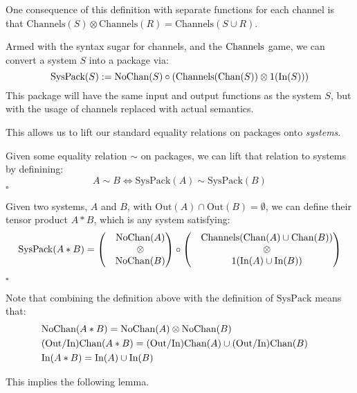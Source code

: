 One consequence of this definition with separate functions for each channel
is that $\text{Channels}(S) \otimes \text{Channels}(R) = \text{Channels}(S \cup R)$.

Armed with the syntax sugar for channels, and the $\text{Channels}$ game,
we can convert a system $S$ into a package via:
$$
\text{SysPack}(S) := \text{NoChan}(S) \circ (\text{Channels}(\text{Chan}(S)) \otimes 1(\text{In}(S)))
$$
This package will have the same input and output functions as the system $S$,
but with the usage of channels replaced with actual semantics.

This allows us to lift our standard equality relations on packages onto
\emph{systems}.
\begin{definition}
Given some equality relation $\sim$ on packages, we can lift that relation
to systems by definining:
$$
A \sim B \iff \text{SysPack}(A) \sim \text{SysPack}(B)
$$
$\square$
\end{definition}

\begin{definition}
Given two systems, $A$ and $B$, with \(\text{Out}(A) \cap \text{Out}(B) = \emptyset\), we can define their tensor product $A * B$,
which is any system satisfying:
$$
\text{SysPack}(A * B) =
\begin{pmatrix}
&\text{NoChan}(A)\cr
&\otimes\cr
&\text{NoChan}(B)\cr
\end{pmatrix}
\circ
\begin{pmatrix}
&\text{Channels}(\text{Chan}(A) \cup \text{Chan}(B))\cr
&\otimes\cr
&1(\text{In}(A) \cup \text{In}(B))\cr
\end{pmatrix}
$$

$\square$
\end{definition}

Note that combining the definition above with the definition of $\text{SysPack}$
means that:
$$
\begin{aligned}
&\text{NoChan}(A * B) = \text{NoChan}(A) \otimes \text{NoChan}(B)\cr
&\text{(Out/In)Chan}(A * B) = \text{(Out/In)Chan}(A) \cup \text{(Out/In)Chan}(B)\cr
&\text{In}(A * B) = \text{In}(A) \cup \text{In}(B)\cr
\end{aligned}
$$

This implies the following lemma.

